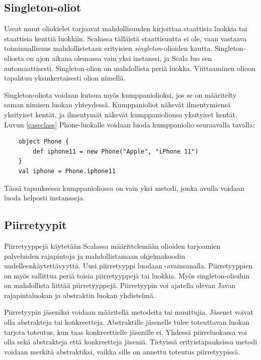 \subsection{Singleton-oliot} \label{singleton-oliot}
Useat muut oliokielet tarjoavat mahdollisuuden kirjoittaa staattisia luokkia tai staattisia kenttiä luokkiin. Scalassa tälläistä staattisuutta ei ole, vaan vastaava toiminnallisuus mahdollistetaan erityisien \textit{singleton}-olioiden kautta. Singleton-oliosta on ajon aikana olemassa vain yksi instanssi, ja Scala luo sen automaattisesti. Singleton-olion on mahdollista periä luokka. Viittaaminen olioon tapahtuu yksinkertaisesti olion nimellä.
\cite[Singleton objects]{tourOfScala}

Singleton-oliota voidaan kutsua myös kumppaniolioksi, jos se on määritelty saman nimisen luokan yhteydessä. Kumppanioliot näkevät ilmentymiensä yksityiset kentät, ja ilmentymät näkevät kumppaniolionsa yksityiset kentät. Luvun \ref{caseclass} Phone-luokalle voidaan luoda kumppaniolio seuraavalla tavalla:
\begin{lstlisting}
    object Phone {
        def iphone11 = new Phone("Apple", "iPhone 11")
    }
    val iphone = Phone.iphone11
\end{lstlisting}
Tässä tapauksessa kumppanioliossa on vain yksi metodi, jonka avulla voidaan luoda helposti instansseja.
\cite[Luku 4]{prorgrammingInScala3rd}


\subsection{Piirretyypit} \label{piirretyypit}
Piirretyyppejä käytetään Scalassa määrittelemään olioiden tarjoamien palveluiden rajapintoja ja mahdollistamaan ohjelmakoodin uudelleenkäytettävyyttä. Uusi piirretyyppi luodaan -avainsanalla. Piirretyyppien on myös sallittua periä toisia piirretyyppejä tai luokkia. Myös singleton-olioihin on mahdollista liittää piirretyyppejä. Piirretyypin voi ajatella olevan Javan rajapintaluokan ja abstraktin luokan yhdistelmä.
\cite[Luku 6 ja 12]{prorgrammingInScala3rd}

Piirretyypin jäseniksi voidaan määritellä metodeita tai muuttujia. Jäsenet voivat olla abstrakteja tai konkreetteja. Abstraktille jäsenelle tulee toteuttavan luokan tarjota toteutus, kun taas konkreettielle jäsenille ei. Yhdessä piirreluokassa voi olla sekä abstrakteja että konkreetteja jäseniä. Tietyissä erityistapauksissa metodi voidaan merkitä abstraktiksi, vaikka sille on annettu toteutus piirretyypissä.
\cite[Luku 10]{scalaForTheImpatient}

